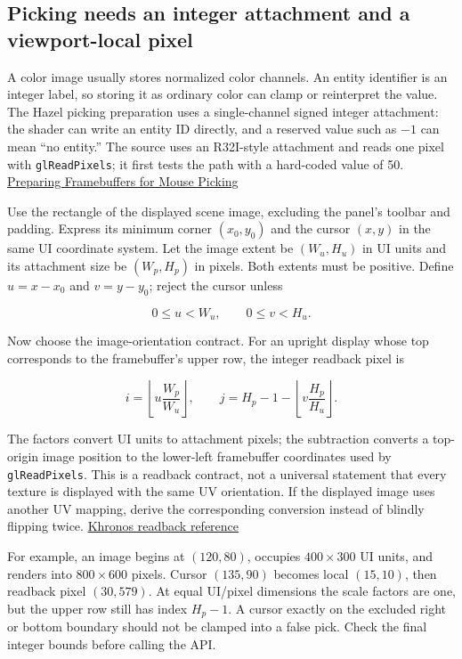 \subsection{Picking needs an integer attachment and a viewport-local pixel}\label{06-engine-ii-ch032-picking-needs-an-integer-attachment-and-a-viewport-local-pixel}

\hypertarget{06-engine-ii-ch032-picking-needs-an-integer-attachment-and-a-viewport-local-pixel}{}

A color image usually stores normalized color channels. An entity identifier is an integer label, so storing it as ordinary color can clamp or reinterpret the value. The Hazel picking preparation uses a single-channel signed integer attachment: the shader can write an entity ID directly, and a reserved value such as \(-1\) can mean ``no entity.'' The source uses an R32I-style attachment and reads one pixel with \texttt{glReadPixels}; it first tests the path with a hard-coded value of 50. \href{https://www.youtube.com/watch?v=wYVaIOUhz6s}{Preparing Framebuffers for Mouse Picking}

Use the rectangle of the displayed scene image, excluding the panel's toolbar and padding. Express its minimum corner \((x_0,y_0)\) and the cursor \((x,y)\) in the same UI coordinate system. Let the image extent be \((W_u,H_u)\) in UI units and its attachment size be \((W_p,H_p)\) in pixels. Both extents must be positive. Define \(u=x-x_0\) and \(v=y-y_0\); reject the cursor unless

\[0\leq u<W_u,\qquad0\leq v<H_u.\]

Now choose the image-orientation contract. For an upright display whose top corresponds to the framebuffer's upper row, the integer readback pixel is

\[
i=\left\lfloor u\frac{W_p}{W_u}\right\rfloor,
\qquad
j=H_p-1-\left\lfloor v\frac{H_p}{H_u}\right\rfloor.
\]

The factors convert UI units to attachment pixels; the subtraction converts a top-origin image position to the lower-left framebuffer coordinates used by \texttt{glReadPixels}. This is a readback contract, not a universal statement that every texture is displayed with the same UV orientation. If the displayed image uses another UV mapping, derive the corresponding conversion instead of blindly flipping twice. \href{https://github.com/KhronosGroup/OpenGL-Refpages/blob/main/gl4/glReadPixels.xml}{Khronos readback reference}

For example, an image begins at \((120,80)\), occupies \(400\times300\) UI units, and renders into \(800\times600\) pixels. Cursor \((135,90)\) becomes local \((15,10)\), then readback pixel \((30,579)\). At equal UI/pixel dimensions the scale factors are one, but the upper row still has index \(H_p-1\). A cursor exactly on the excluded right or bottom boundary should not be clamped into a false pick. Check the final integer bounds before calling the API.

